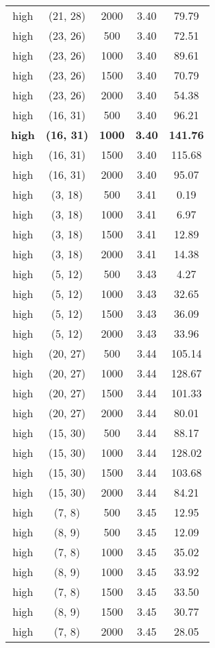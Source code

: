 \begin{tabular}{c c c c c}
high & (21, 28) &  2000 & 3.40 & 79.79 \\
high & (23, 26) &  500 & 3.40 & 72.51 \\
high & (23, 26) &  1000 & 3.40 & 89.61 \\
high & (23, 26) &  1500 & 3.40 & 70.79 \\
high & (23, 26) &  2000 & 3.40 & 54.38 \\
high & (16, 31) &  500 & 3.40 & 96.21 \\
\textbf{high} & \textbf{(16, 31)} & \textbf{ 1000} & \textbf{3.40} & \textbf{141.76} \\
high & (16, 31) &  1500 & 3.40 & 115.68 \\
high & (16, 31) &  2000 & 3.40 & 95.07 \\
high & (3, 18) &  500 & 3.41 & 0.19 \\
high & (3, 18) &  1000 & 3.41 & 6.97 \\
high & (3, 18) &  1500 & 3.41 & 12.89 \\
high & (3, 18) &  2000 & 3.41 & 14.38 \\
high & (5, 12) &  500 & 3.43 & 4.27 \\
high & (5, 12) &  1000 & 3.43 & 32.65 \\
high & (5, 12) &  1500 & 3.43 & 36.09 \\
high & (5, 12) &  2000 & 3.43 & 33.96 \\
high & (20, 27) &  500 & 3.44 & 105.14 \\
high & (20, 27) &  1000 & 3.44 & 128.67 \\
high & (20, 27) &  1500 & 3.44 & 101.33 \\
high & (20, 27) &  2000 & 3.44 & 80.01 \\
high & (15, 30) &  500 & 3.44 & 88.17 \\
high & (15, 30) &  1000 & 3.44 & 128.02 \\
high & (15, 30) &  1500 & 3.44 & 103.68 \\
high & (15, 30) &  2000 & 3.44 & 84.21 \\
high & (7, 8) &  500 & 3.45 & 12.95 \\
high & (8, 9) &  500 & 3.45 & 12.09 \\
high & (7, 8) &  1000 & 3.45 & 35.02 \\
high & (8, 9) &  1000 & 3.45 & 33.92 \\
high & (7, 8) &  1500 & 3.45 & 33.50 \\
high & (8, 9) &  1500 & 3.45 & 30.77 \\
high & (7, 8) &  2000 & 3.45 & 28.05 \\

\end{tabular}
